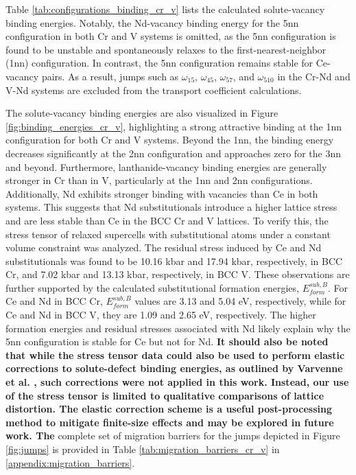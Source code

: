 \documentclass[preprint,12pt]{elsarticle}
\providecommand{\DIFaddtex}[1]{{\bf #1}} %
\providecommand{\DIFdeltex}[1]{} %
\providecommand{\DIFaddbegin}{\protect\color{blue}} %
\providecommand{\DIFaddend}{\protect\color{black}} %
\providecommand{\DIFdelbegin}{\protect\color{red}} %
\providecommand{\DIFdelend}{\protect\color{black}} %
\providecommand{\DIFadd}[1]{\texorpdfstring{\DIFaddtex{#1}}{#1}} %
\providecommand{\DIFdel}[1]{\texorpdfstring{\DIFdeltex{#1}}{}} %
\newcommand{\DIFscaledelfig}{0.5}
\newlength{\DIFdelgraphicswidth} %
\newlength{\DIFdelgraphicsheight} %
\newcommand{\DIFaddincludegraphics}[2][]{{\color{blue}\fbox{\DIFOincludegraphics[#1]{#2}}}} %
\newcommand{\DIFdelincludegraphics}[2][]{%
\sbox{\DIFdelgraphicsbox}{\DIFOincludegraphics[#1]{#2}}%
\settoboxwidth{\DIFdelgraphicswidth}{\DIFdelgraphicsbox} %
\settoboxtotalheight{\DIFdelgraphicsheight}{\DIFdelgraphicsbox} %
\scalebox{\DIFscaledelfig}{%
\parbox[b]{\DIFdelgraphicswidth}{\usebox{\DIFdelgraphicsbox}\\[-\baselineskip] \rule{\DIFdelgraphicswidth}{0em}}\llap{\resizebox{\DIFdelgraphicswidth}{\DIFdelgraphicsheight}{%
\setlength{\unitlength}{\DIFdelgraphicswidth}%
\begin{picture}(1,1)%
\thicklines\linethickness{2pt} %
{\color[rgb]{1,0,0}\put(0,0){\framebox(1,1){}}}%
{\color[rgb]{1,0,0}\put(0,0){\line( 1,1){1}}}%
{\color[rgb]{1,0,0}\put(0,1){\line(1,-1){1}}}%
\end{picture}%
}\hspace*{3pt}}} %
} %
\DeclareRobustCommand{\DIFaddbegin}{\DIFOaddbegin \let\includegraphics\DIFaddincludegraphics} %
\DeclareRobustCommand{\DIFaddend}{\DIFOaddend \let\includegraphics\DIFOincludegraphics} %
\DeclareRobustCommand{\DIFdelbegin}{\DIFOdelbegin \let\includegraphics\DIFdelincludegraphics} %
\DeclareRobustCommand{\DIFdelend}{\DIFOaddend \let\includegraphics\DIFOincludegraphics} %
\begin{document}
Table \ref{tab:configurations_binding_cr_v} lists the calculated solute-vacancy binding energies. Notably, the Nd-vacancy binding energy for the 5nn configuration in both Cr and V systems is omitted, as the 5nn configuration is found to be unstable and spontaneously relaxes to the first-nearest-neighbor (1nn) configuration. In contrast, the 5nn configuration remains stable for Ce-vacancy pairs. As a result, jumps such as $\omega_{15}$, $\omega_{45}$, $\omega_{57}$, and $\omega_{510}$ in the Cr-Nd and V-Nd systems are excluded from the transport coefficient calculations.

The solute-vacancy binding energies are also visualized in Figure \ref{fig:binding_energies_cr_v}, highlighting a strong attractive binding at the 1nn configuration for both Cr and V systems. Beyond the 1nn, the binding energy decreases significantly at the 2nn configuration and approaches zero for the 3nn and beyond. Furthermore, lanthanide-vacancy binding energies are generally stronger in Cr than in V, particularly at the 1nn and 2nn configurations. Additionally, Nd exhibits stronger binding with vacancies than Ce in both systems. This suggests that Nd substitutionals introduce a higher lattice stress and are less stable than Ce in the BCC Cr and V lattices. To verify this, the stress tensor of relaxed supercells with substitutional atoms under a constant volume constraint was analyzed. The residual stress induced by Ce and Nd substitutionals was found to be 10.16 kbar and 17.94 kbar, respectively, in BCC Cr, and 7.02 kbar and 13.13 kbar, respectively, in BCC V. These observations are further supported by the calculated substitutional formation energies, $E_{form}^{sub, B}$. For Ce and Nd in BCC Cr, $E_{form}^{sub, B}$ values are 3.13 and 5.04 eV, respectively, while for Ce and Nd in BCC V, they are 1.09 and 2.65 eV, respectively. The higher formation energies and residual stresses associated with Nd likely explain why the 5nn configuration is stable for Ce but not for Nd. \DIFdelbegin \DIFdel{The }\DIFdelend \DIFaddbegin \DIFadd{It should also be noted that while the stress tensor data could also be used to perform elastic corrections to solute-defect binding energies, as outlined by Varvenne et al. \cite{varvenne_point_2013, varvenne_elastic_2017}, such corrections were not applied in this work. Instead, our use of the stress tensor is limited to qualitative comparisons of lattice distortion. The elastic correction scheme is a useful post-processing method to mitigate finite-size effects and may be explored in future work.
The }\DIFaddend complete set of migration barriers for the jumps depicted in Figure \ref{fig:jumps} is provided in Table \ref{tab:migration_barriers_cr_v} in \ref{appendix:migration_barriers}.
\end{document}
